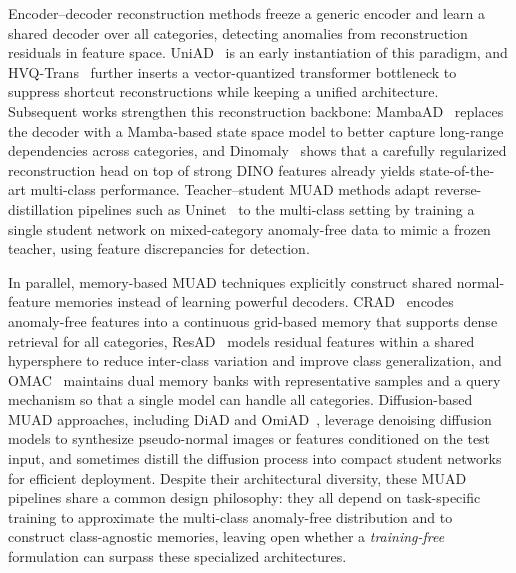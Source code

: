\documentclass{article}
\theoremstyle{plain}
\theoremstyle{definition}
\theoremstyle{remark}
\begin{document}
Encoder--decoder reconstruction methods freeze a generic encoder and learn a shared decoder over all categories, detecting anomalies from reconstruction residuals in feature space. UniAD~\cite{you2022unified} is an early instantiation of this paradigm, and HVQ-Trans~\cite{lu2023hierarchical} further inserts a vector-quantized transformer bottleneck to suppress shortcut reconstructions while keeping a unified architecture. Subsequent works strengthen this reconstruction backbone: MambaAD~\cite{he2024mambaad} replaces the decoder with a Mamba-based state space model to better capture long-range dependencies across categories, and Dinomaly~\cite{guo2025dinomaly} shows that a carefully regularized reconstruction head on top of strong DINO features already yields state-of-the-art multi-class performance. Teacher--student MUAD methods adapt reverse-distillation pipelines such as Uninet~\cite{wei2025uninet} to the multi-class setting by training a single student network on mixed-category anomaly-free data to mimic a frozen teacher, using feature discrepancies for detection.

In parallel, memory-based MUAD techniques explicitly construct shared normal-feature memories instead of learning powerful decoders. CRAD~\cite{lee2024continuous} encodes anomaly-free features into a continuous grid-based memory that supports dense retrieval for all categories, ResAD~\cite{yao2024resad} models residual features within a shared hypersphere to reduce inter-class variation and improve class generalization, and OMAC~\cite{tan2024unsupervised} maintains dual memory banks with representative samples and a query mechanism so that a single model can handle all categories. Diffusion-based MUAD approaches, including DiAD and OmiAD~\cite{he2024diffusion,fengomiad}, leverage denoising diffusion models to synthesize pseudo-normal images or features conditioned on the test input, and sometimes distill the diffusion process into compact student networks for efficient deployment. Despite their architectural diversity, these MUAD pipelines share a common design philosophy: they all depend on task-specific training to approximate the multi-class anomaly-free distribution and to construct class-agnostic memories, leaving open whether a \emph{training-free} formulation can surpass these specialized architectures.
\end{document}
